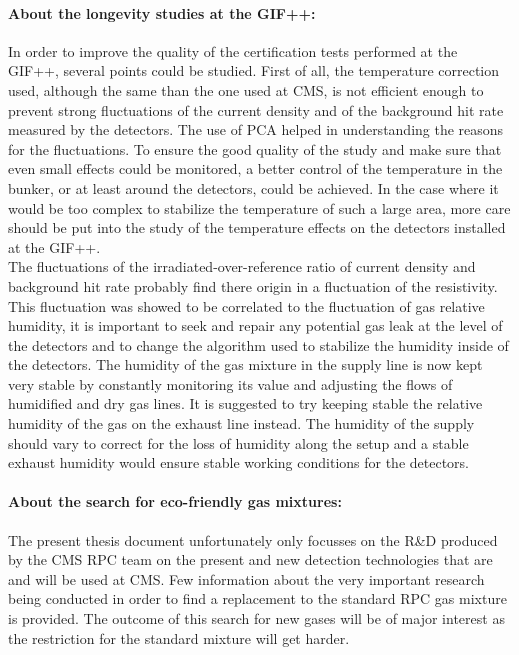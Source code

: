 	\paragraph*{About the longevity studies at the GIF++:} In order to improve the quality of the certification tests performed at the GIF++, several points could be studied. First of all, the temperature correction used, although the same than the one used at CMS, is not efficient enough to prevent strong fluctuations of the current density and of the background hit rate measured by the detectors. The use of \acl{PCA} helped in understanding the reasons for the fluctuations. To ensure the good quality of the study and make sure that even small effects could be monitored, a better control of the temperature in the bunker, or at least around the detectors, could be achieved. In the case where it would be too complex to stabilize the temperature of such a large area, more care should be put into the study of the temperature effects on the detectors installed at the GIF++.\\
	The fluctuations of the irradiated-over-reference ratio of current density and background hit rate probably find there origin in a fluctuation of the resistivity. This fluctuation was showed to be correlated to the fluctuation of gas relative humidity, it is important to seek and repair any potential gas leak at the level of the detectors and to change the algorithm used to stabilize the humidity inside of the detectors. The humidity of the gas mixture in the supply line is now kept very stable by constantly monitoring its value and adjusting the flows of humidified and dry gas lines. It is suggested to try keeping stable the relative humidity of the gas on the exhaust line instead. The humidity of the supply should vary to correct for the loss of humidity along the setup and a stable exhaust humidity would ensure stable working conditions for the detectors.
	
	\paragraph*{About the search for eco-friendly gas mixtures:} The present thesis document unfortunately only focusses on the R\&D produced by the CMS RPC team on the present and new detection technologies that are and will be used at CMS. Few information about the very important research being conducted in order to find a replacement to the standard RPC gas mixture is provided. The outcome of this search for new gases will be of major interest as the restriction for the standard mixture will get harder.
	
